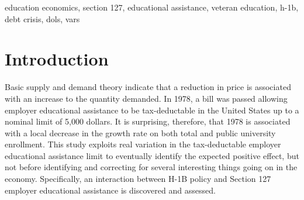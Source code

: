 \documentclass[review]{elsarticle}
\begin{document}
\begin{frontmatter}
\begin{keyword}
education economics, section 127, educational assistance, veteran education, h-1b, debt crisis, dols, vars
\MSC[2010] %
\end{keyword}
\end{frontmatter}

\pagebreak
\linenumbers

    \section{Introduction}


    Basic supply and demand theory indicate that a reduction in price is associated with an increase to the quantity demanded.
    In 1978, a bill was passed allowing employer educational assistance to be tax-deductable in the United States up to a nominal limit of 5,000 dollars.
    It is surprising, therefore, that 1978 is associated with a local decrease in the growth rate on both total and public university enrollment.
    This study exploits real variation in the tax-deductable employer educational assistance limit to eventually identify the expected positive effect,
    but not before identifying and correcting for several interesting things going on in the economy.
    Specifically, an interaction between H-1B policy and Section 127 employer educational assistance is discovered and assessed.
\end{document}
